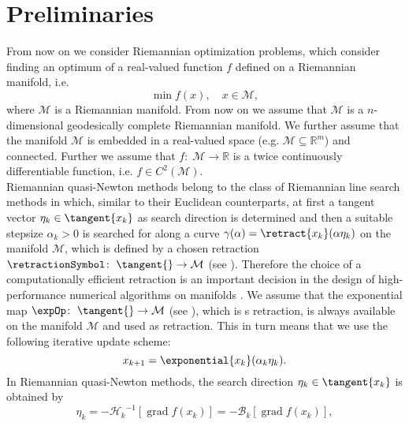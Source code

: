 \section{Preliminaries}

From now on we consider Riemannian optimization problems, which consider finding an optimum of a real-valued function $f$ defined on a Riemannian manifold, i.e.
\begin{equation}\label{RiemannianOptimizationProblem}
    \min f(x), \quad x \in \mathcal{M},
\end{equation}
where $\mathcal{M}$ is a Riemannian manifold. From now on we assume that $\mathcal{M}$ is a $n$-dimensional geodesically complete Riemannian manifold. We further assume that the manifold $\mathcal{M}$ is embedded in a real-valued space (e.g. $\mathcal{M} \subseteq \mathbb{R}^m$) and connected. Further we assume that $f \colon \; \mathcal{M} \to \mathbb{R}$ is a twice continuously differentiable function, i.e. $f \in C^2(\mathcal{M})$. \\
Riemannian quasi-Newton methods belong to the class of Riemannian line search methods in which, similar to their Euclidean counterparts, at first a tangent vector $\eta_k \in \tangent{x_k}$ as search direction is determined and then a suitable stepsize $\alpha_k > 0$ is searched for along a curve $\gamma(\alpha) = \retract{x_k}(\alpha \eta_k)$ on the manifold $\mathcal{M}$, which is defined by a chosen retraction $\retractionSymbol \colon \; \tangent{} \to \mathcal{M}$ (see \cite[Definition~4.1.1]{AbsilMahonySepulchre:2008}). Therefore the choice of a computationally efficient retraction is an important decision in the design of high-performance numerical algorithms on manifolds \cite[p.~54]{AbsilMahonySepulchre:2008}. We assume that the exponential map $\expOp \colon \; \tangent{} \to \mathcal{M}$ (see \cite[p.~102-103]{AbsilMahonySepulchre:2008}), which is s retraction, is always available on the manifold $\mathcal{M}$ and used as retraction. This in turn means that we use the following iterative update scheme:
\begin{equation}\label{RiemannianIterativeUpdateScheme}
    x_{k+1} = \exponential{x_k}(\alpha_k \eta_k).
\end{equation}
In Riemannian quasi-Newton methods, the search direction $\eta_k \in \tangent{x_k}$ is obtained by 
\begin{equation*}
    \eta_k = -{\mathcal{H}_k}^{-1}[\operatorname{grad} f(x_k)] = -\mathcal{B}_k [\operatorname{grad} f(x_k)],
\end{equation*}
